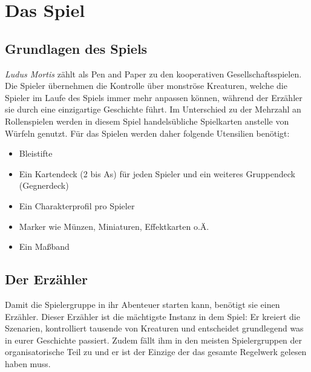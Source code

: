 \chapter{Das Spiel}
\section{Grundlagen des Spiels}
	
    \textit{Ludus Mortis} zählt als Pen and Paper zu den kooperativen Gesellschaftsspielen. Die Spieler übernehmen die Kontrolle über monströse Kreaturen, welche die Spieler im Laufe des Spiels immer mehr anpassen können, während der Erzähler sie durch eine einzigartige Geschichte führt. Im Unterschied zu der Mehrzahl an Rollenspielen werden in diesem Spiel handelsübliche Spielkarten anstelle von Würfeln genutzt. Für das Spielen werden daher folgende Utensilien benötigt:

    \begin{itemize}
	    \item Bleistifte
	    \item Ein Kartendeck (2 bis As) für jeden Spieler und ein weiteres Gruppendeck (Gegnerdeck)
	    \item Ein Charakterprofil pro Spieler
	    \item Marker wie Münzen, Miniaturen, Effektkarten o.Ä.
	    \item Ein Maßband
    \end{itemize}
	
	
\section{Der Erzähler}
    Damit die Spielergruppe in ihr Abenteuer starten kann, benötigt sie einen Erzähler. Dieser Erzähler ist die mächtigste Instanz in dem Spiel: Er kreiert die Szenarien, kontrolliert tausende von Kreaturen und entscheidet grundlegend was in eurer Geschichte passiert. Zudem fällt ihm in den meisten Spielergruppen der organisatorische Teil zu und er ist der Einzige der das gesamte Regelwerk gelesen haben muss.
    

